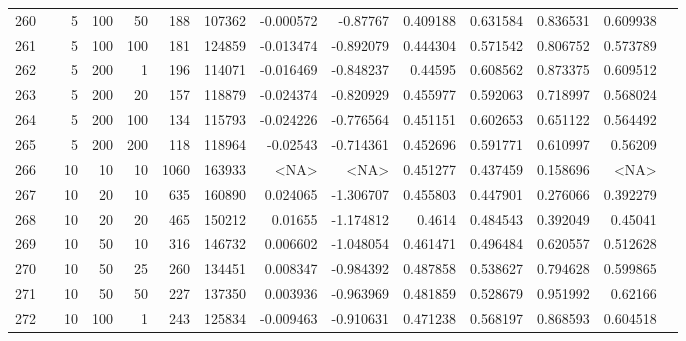\begin{longtable}{llrrrrrrrrrrrr}
		260 & &            5 &               100 &           50 &         188 &     107362 & -0.000572 &  -0.87767 &  0.409188 &    0.631584 &       0.836531 &  0.609938 \\
		261 & &            5 &               100 &          100 &         181 &     124859 & -0.013474 & -0.892079 &  0.444304 &    0.571542 &       0.806752 &  0.573789 \\
		262 & &            5 &               200 &            1 &         196 &     114071 & -0.016469 & -0.848237 &   0.44595 &    0.608562 &       0.873375 &  0.609512 \\
		263 & &            5 &               200 &           20 &         157 &     118879 & -0.024374 & -0.820929 &  0.455977 &    0.592063 &       0.718997 &  0.568024 \\
		264 & &            5 &               200 &          100 &         134 &     115793 & -0.024226 & -0.776564 &  0.451151 &    0.602653 &       0.651122 &  0.564492 \\
		265 & &            5 &               200 &          200 &         118 &     118964 &  -0.02543 & -0.714361 &  0.452696 &    0.591771 &       0.610997 &   0.56209 \\
		266 & &           10 &                10 &           10 &           1060 &     163933 &      <NA> &      <NA> &  0.451277 &    0.437459 &       0.158696 &  <NA> \\
		267 & &           10 &                20 &           10 &         635 &     160890 &  0.024065 & -1.306707 &  0.455803 &    0.447901 &       0.276066 &  0.392279 \\
		268 & &           10 &                20 &           20 &         465 &     150212 &   0.01655 & -1.174812 &    0.4614 &    0.484543 &       0.392049 &   0.45041 \\
		269 & &           10 &                50 &           10 &         316 &     146732 &  0.006602 & -1.048054 &  0.461471 &    0.496484 &       0.620557 &  0.512628 \\
		270 & &           10 &                50 &           25 &         260 &     134451 &  0.008347 & -0.984392 &  0.487858 &    0.538627 &       0.794628 &  0.599865 \\
		271 & &           10 &                50 &           50 &         227 &     137350 &  0.003936 & -0.963969 &  0.481859 &    0.528679 &       0.951992 &   0.62166 \\
		272 & &           10 &               100 &            1 &         243 &     125834 & -0.009463 & -0.910631 &  0.471238 &    0.568197 &       0.868593 &  0.604518 \\

\end{longtable}
